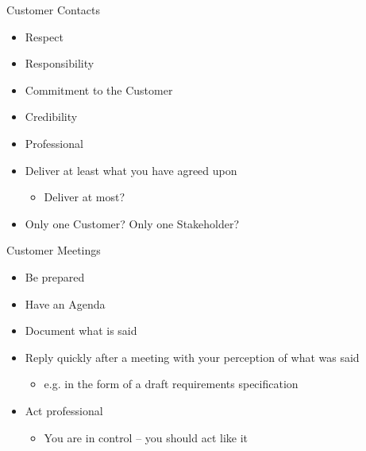 \documentclass[10pt,t,a4paper]{beamer}
\begin{document}
\begin{frame}[shrink=15,label=sec-1-16]{Customer Contacts}
\begin{itemize}
\item Respect
\item Responsibility
\item Commitment to the Customer
\item Credibility
\item Professional
\item Deliver at least what you have agreed upon
\begin{itemize}
\item Deliver at most?
\end{itemize}
\item Only one Customer? Only one Stakeholder?
\end{itemize}
\begin{block}{Customer Meetings}
\begin{itemize}
\item Be prepared
\item Have an Agenda
\item Document what is said
\item Reply quickly after a meeting with your perception of what was said
\begin{itemize}
\item e.g. in the form of a draft requirements specification
\end{itemize}
\item Act professional
\begin{itemize}
\item You are in control -- you should act like it
\end{itemize}
\end{itemize}
\end{block}
\end{frame}
\end{document}
